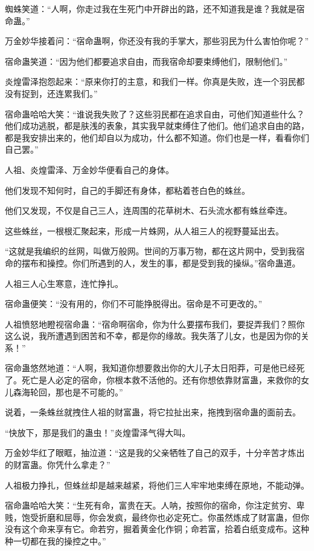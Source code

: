 \begin{this_body}
蜘蛛笑道：“人啊，你走过我在生死门中开辟出的路，还不知道我是谁？我就是宿命蛊。”

万金妙华接着问：“宿命蛊啊，你还没有我的手掌大，那些羽民为什么害怕你呢？”

宿命蛊笑道：“因为他们都要追求自由，而我宿命却要束缚他们，限制他们。”

炎煌雷泽抱怨起来：“原来你打的主意，和我们一样。你真是失败，连一个羽民都没有捉到，还连累我们。”

宿命蛊哈哈大笑：“谁说我失败了？这些羽民都在追求自由，可他们知道些什么？他们成功逃脱，都是肤浅的表象，其实我早就束缚住了他们。他们追求自由的路，都是我安排出来的，他们却自以为成功，什么都不知道。你们也是一样，看看你们自己罢。”

人祖、炎煌雷泽、万金妙华便看自己的身体。

他们发现不知何时，自己的手脚还有身体，都粘着苍白色的蛛丝。

他们又发现，不仅是自己三人，连周围的花草树木、石头流水都有蛛丝牵连。

这些蛛丝，一根根汇聚起来，形成一片蛛网，从人祖三人的视野蔓延出去。

“这就是我编织的丝网，叫做万般网。世间的万事万物，都在这片网中，受到我宿命的摆布和操控。你们所遇到的人，发生的事，都是受到我的操纵。”宿命蛊道。

人祖三人心生寒意，连忙挣扎。

宿命蛊便笑：“没有用的，你们不可能挣脱得出。宿命是不可更改的。”

人祖愤怒地瞪视宿命蛊：“宿命啊宿命，你为什么要摆布我们，要捉弄我们？照你这么说，我所遭遇到困苦和不幸，都是你的缘故。我失落了儿女，也是因为你的关系！”

宿命蛊悠然地道：“人啊，我知道你想要救出你的大儿子太日阳莽，可是他已经死了。死亡是人必定的宿命，你根本救不活他的。还有你想依靠财富蛊，来救你的女儿森海轮回，那也是不可能的。”

说着，一条蛛丝就拽住人祖的财富蛊，将它拉扯出来，拖拽到宿命蛊的面前去。

“快放下，那是我们的蛊虫！”炎煌雷泽气得大叫。

万金妙华红了眼眶，抽泣道：“这是我的父亲牺牲了自己的双手，十分辛苦才炼出的财富蛊。你凭什么拿走？”

人祖极力挣扎，但蛛丝却是越来越紧，将他们三人牢牢地束缚在原地，不能动弹。

宿命蛊哈哈大笑：“生死有命，富贵在天。人呐，按照你的宿命，你注定贫穷、卑贱，饱受折磨和屈辱，你会发疯，最终你也必定死亡。你虽然炼成了财富蛊，但你没有这个命来享有它。命若穷，掘着黄金化作铜；命若富，拾着白纸变成布。这种种一切都在我的操控之中。”


\end{this_body}
